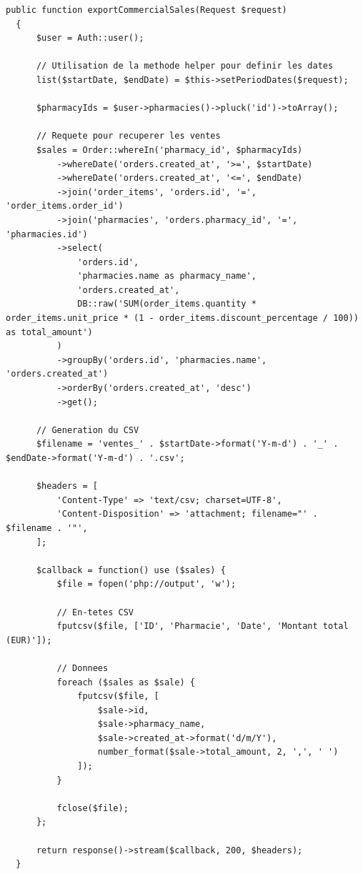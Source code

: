\documentclass[a4paper,12pt]{report}
\begin{document}
  \begin{lstlisting}[caption=Méthode d'export CSV dans ExportController.php]
  public function exportCommercialSales(Request $request)
  {
      $user = Auth::user();
      
      // Utilisation de la methode helper pour definir les dates
      list($startDate, $endDate) = $this->setPeriodDates($request);
      
      $pharmacyIds = $user->pharmacies()->pluck('id')->toArray();
      
      // Requete pour recuperer les ventes
      $sales = Order::whereIn('pharmacy_id', $pharmacyIds)
          ->whereDate('orders.created_at', '>=', $startDate)
          ->whereDate('orders.created_at', '<=', $endDate)
          ->join('order_items', 'orders.id', '=', 'order_items.order_id')
          ->join('pharmacies', 'orders.pharmacy_id', '=', 'pharmacies.id')
          ->select(
              'orders.id',
              'pharmacies.name as pharmacy_name',
              'orders.created_at',
              DB::raw('SUM(order_items.quantity * order_items.unit_price * (1 - order_items.discount_percentage / 100)) as total_amount')
          )
          ->groupBy('orders.id', 'pharmacies.name', 'orders.created_at')
          ->orderBy('orders.created_at', 'desc')
          ->get();
      
      // Generation du CSV
      $filename = 'ventes_' . $startDate->format('Y-m-d') . '_' . $endDate->format('Y-m-d') . '.csv';
      
      $headers = [
          'Content-Type' => 'text/csv; charset=UTF-8',
          'Content-Disposition' => 'attachment; filename="' . $filename . '"',
      ];
      
      $callback = function() use ($sales) {
          $file = fopen('php://output', 'w');
          
          // En-tetes CSV
          fputcsv($file, ['ID', 'Pharmacie', 'Date', 'Montant total (EUR)']);
          
          // Donnees
          foreach ($sales as $sale) {
              fputcsv($file, [
                  $sale->id,
                  $sale->pharmacy_name,
                  $sale->created_at->format('d/m/Y'),
                  number_format($sale->total_amount, 2, ',', ' ')
              ]);
          }
          
          fclose($file);
      };
      
      return response()->stream($callback, 200, $headers);
  }
  \end{lstlisting}
  
\end{document}
